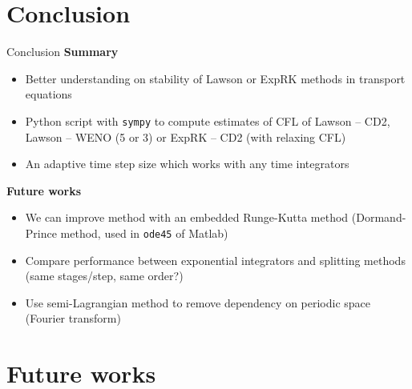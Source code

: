 \documentclass{beamer}
\newcommand{\mbold}[1]{\textbf{\color{mblue}#1}}
\begin{document}
\section{Conclusion}

\begin{frame}{Conclusion}
  \mbold{Summary}
  \begin{itemize}
    \item Better understanding on stability of Lawson or ExpRK methods in transport equations
    \item Python script with \texttt{sympy} to compute estimates of CFL of Lawson -- CD2, Lawson -- WENO (5 or 3) or ExpRK -- CD2 (with relaxing CFL)
    \item An adaptive time step size which works with any time integrators
  \end{itemize}

  \mbold{Future works}
  \begin{itemize}
    \item We can improve method with an embedded Runge-Kutta method (Dormand-Prince method, used in \texttt{ode45} of Matlab)
    \item Compare performance between exponential integrators and splitting methods (same stages/step, same order?)
    \item Use semi-Lagrangian method to remove dependency on periodic space (Fourier transform)
  \end{itemize}
\end{frame}

\section{Future works}
\end{document}
